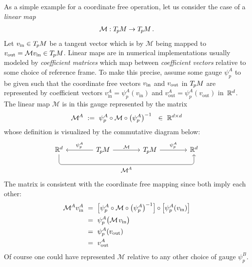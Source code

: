 As a simple example for a coordinate free operation, let us consider the case of a \emph{linear map}
\begin{align}
    \mathcal{M}:T_{\mkern-1.5mu p}\mkern-.5muM\to T_{\mkern-1.5mu p}\mkern-.5muM \,.
\end{align}
Let $v_\text{in}\in T_{\mkern-1.5mu p}\mkern-.5muM$ be a tangent vector which is by $\mathcal{M}$ being mapped to $v_\text{out} = \mathcal{M} v_\text{in} \in T_{\mkern-1.5mu p}\mkern-.5muM$.
Linear maps are in numerical implementations usually modeled by \emph{coefficient matrices} which map between \emph{coefficient vectors} relative to some choice of reference frame.
To make this precise, assume some gauge $\psi_p^A$ to be given such that the coordinate free vectors $v_\textup{in}$ and $v_\textup{out}$ in $T_{\mkern-1.5mu p}\mkern-.5muM$ are represented by coefficient vectors $v_\text{in}^A=\psi_p^A(v_\text{in})$ and $v_\text{out}^A=\psi_p^A(v_\text{out})$ in~$\mathbb{R}^d$.
The linear map $\mathcal{M}$ is in this gauge represented by the matrix%
\begin{align}\label{eq:matrix_trivialization}
    \MAA\ :=\ \psi_p^A \circ \mathcal{M} \circ \big(\psi_p^A\big)^{-1} \ \ \in\ \R^{d\times d}
\end{align}
whose definition is visualized by the commutative diagram below:
\begin{equation}\label{eq:bundle_morphism_onexone}
\begin{tikzcd}[row sep=4.em, column sep=4.em]
    \R^d
            \arrow[rrr, pos=.5, rounded corners, to path={ 
                -- ([yshift=-3.5ex]\tikztostart.south) 
                --node[below]{\small$
                    \MAA
                    $} ([yshift=-3.5ex]\tikztotarget.south) 
                -- (\tikztotarget.south)
                    }]
    & \TpM  \arrow[r, "\mathcal{M}"]
            \arrow[l, "\psi_p^A"']
    & \TpM  \arrow[r, "\psi_p^A"]
    & \R^d
\end{tikzcd}
\end{equation}
The matrix is consistent with the coordinate free mapping since both imply each other:
\begin{align}
    \MAA v^A_\text{in}
    \ &=\ \pig[ \psi_p^A \circ \mathcal{M} \circ \big(\psi_p^A\big)^{-1} \pig] \circ \pig[ \psi_p^A(v_\text{in}) \pig] \notag \\
    \ &=\ \psi_p^A \big( \mathcal{M}\mkern2mu v_\text{in} \big) \notag \\
    \ &=\ \psi_p^A (v_\text{out}) \notag \\
    \ &=\ v_\text{out}^A
\end{align}
Of course one could have represented $\mathcal{M}$ relative to any other choice of gauge $\psi_p^B$.
